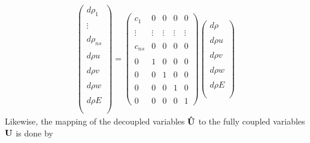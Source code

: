 \documentclass{article}   	%
\begin{document}
\begin{align}
  \begin{pmatrix}
 		d \rho_1    \\ \\
		  \vdots    \\ \\
		d \rho_{ns} \\ \\
		d \rho u    \\ \\
		d \rho v    \\ \\
		d \rho w    \\ \\
		d \rho E    \\ \\
	\end{pmatrix} =
  \begin{pmatrix}
    c_1    & 0 & 0 & 0 & 0 \\ \\
    \vdots & \vdots & \vdots & \vdots & \vdots \\ \\
    c_{ns} & 0 & 0 & 0 & 0 \\ \\
    0      & 1 & 0 & 0 & 0 \\ \\
    0      & 0 & 1 & 0 & 0 \\ \\
    0      & 0 & 0 & 1 & 0 \\ \\
    0      & 0 & 0 & 0 & 1
  \end{pmatrix}
  \begin{pmatrix}
 		d \rho    \\ \\
		d \rho u  \\ \\
		d \rho v  \\ \\
		d \rho w  \\ \\
		d \rho E  \\ \\
	\end{pmatrix}
  \label{q-map1}
\end{align}
Likewise, the mapping of the decoupled variables $\mathbf{\hat{U}}$ to the
fully coupled variables $\mathbf U$ is done by
\end{document}
